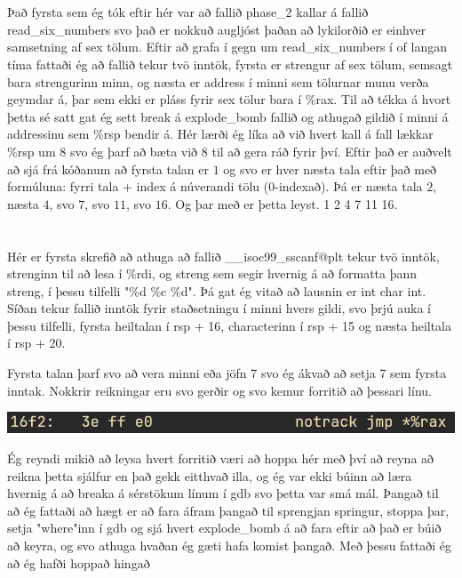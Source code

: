 \documentclass{article}
\begin{document}
	\section{}
	Það fyrsta sem ég tók eftir hér var að fallið phase\_2 kallar á fallið 
	read\_six\_numbers svo það er nokkuð augljóst þaðan að lykilorðið er 
	einhver samsetning af sex tölum. Eftir að grafa í gegn um 
	read\_six\_numbers í of langan tíma fattaði ég að fallið tekur tvö 
	inntök, fyrsta er strengur af sex tölum, semsagt bara strengurinn minn, 
	og næsta er address í minni sem tölurnar munu verða geymdar á, þar sem 
	ekki er pláss fyrir sex tölur bara í \%rax. Til að tékka á hvort þetta 
	sé satt gat ég sett break á explode\_bomb fallið og athugað gildið í 
	minni á addressinu sem \%rsp bendir á. Hér lærði ég líka að við hvert 
	kall á fall lækkar \%rsp um $8$ svo ég þarf að bæta við $8$ til að gera 
	ráð fyrir því. Eftir það er auðvelt að sjá frá kóðanum að fyrsta talan 
	er $1$ og svo er hver næsta tala eftir það með formúluna: fyrri tala + 
	index á núverandi tölu (0-indexað). Þá er næsta tala $2$, næsta $4$, svo 
	$7$, svo $11$, svo $16$. Og þar með er þetta leyst. 1 2 4 7 11 16.

	\section{}
	Hér er fyrsta skrefið að athuga að fallið \_\_isoc99\_sscanf@plt tekur 
	tvö inntök, strenginn til að lesa í \%rdi, og streng sem segir hvernig 
	á að formatta þann streng, í þessu tilfelli "\%d \%c \%d". Þá gat ég vitað að lausnin er int char int. 
Síðan tekur 
	fallið inntök fyrir staðsetningu í minni hvers gildi, svo þrjú auka í 
	þessu tilfelli, fyrsta heiltalan í rsp + 16, characterinn í rsp + 15 og 
	næsta heiltala í rsp + 20. 

	Fyrsta talan þarf svo að vera minni eða jöfn 7 svo ég ákvað að setja 7 
	sem fyrsta inntak. Nokkrir reikningar eru svo gerðir og svo kemur 
	forritið að þessari línu.

	\begin{center}
		\includegraphics[scale=0.35]{notrack.png}
	\end{center}
	Ég reyndi mikið að leysa hvert forritið væri að hoppa hér með því að 
	reyna að reikna þetta sjálfur en það gekk eitthvað illa, og ég var ekki 
	búinn að læra hvernig á að breaka á sérstökum línum í gdb svo þetta var 
	smá mál. Þangað til að ég fattaði að hægt er að fara áfram þangað til 
	sprengjan springur, stoppa þar, setja "where"\hspace{.5em}inn í gdb og 
	sjá hvert explode\_bomb á að fara eftir að það er búið að keyra, og svo athuga hvaðan ég gæti hafa 
	komist þangað. Með þessu fattaði ég að ég hafði hoppað hingað
\end{document}
